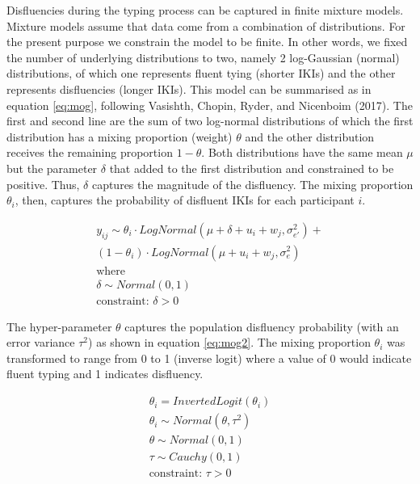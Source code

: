 \documentclass[english,jou,floatsintext]{apa7}
\begin{document}
Disfluencies during the typing process can be captured in finite mixture models. Mixture models assume that data come from a combination of distributions. For the present purpose we constrain the model to be finite. In other words, we fixed the number of underlying distributions to two, namely 2 log-Gaussian (normal) distributions, of which one represents fluent tying (shorter IKIs) and the other represents disfluencies (longer IKIs). This model can be summarised as in equation \ref{eq:mog}, following Vasishth, Chopin, Ryder, and Nicenboim (2017). The first and second line are the sum of two log-normal distributions of which the first distribution has a mixing proportion (weight) \(\theta\) and the other distribution receives the remaining proportion \(1-\theta\). Both distributions have the same mean \(\mu\) but the parameter \(\delta\) that added to the first distribution and constrained to be positive. Thus, \(\delta\) captures the magnitude of the disfluency. The mixing proportion \(\theta_i\), then, captures the probability of disfluent IKIs for each participant \(i\).

\[
\tag{7}
\begin{aligned}
    y_{ij} \sim \theta_i \cdot LogNormal(\mu + \delta + u_i + w_j, \sigma_{e'}^2) +\\
        (1 - \theta_i) \cdot LogNormal(\mu + u_i + w_j, \sigma_{e}^2)\\
        \text{where}\\
        \delta \sim Normal(0,1)\\
        \text{constraint: } \delta > 0
\end{aligned}   
\label{eq:mog}
\]

The hyper-parameter \(\theta\) captures the population disfluency probability (with an error variance \(\tau^2\)) as shown in equation \ref{eq:mog2}. The mixing proportion \(\theta_i\) was transformed to range from 0 to 1 (inverse logit) where a value of 0 would indicate fluent typing and 1 indicates disfluency.

\[
\tag{8}
\begin{aligned}
        \theta_i = InvertedLogit(\theta_i)\\
        \theta_i \sim Normal(\theta,\tau^2)\\
        \theta \sim Normal(0,1)\\
        \tau \sim Cauchy(0,1)\\
        \text{constraint: } \tau > 0
\end{aligned}   
\label{eq:mog2}
\]
\end{document}
